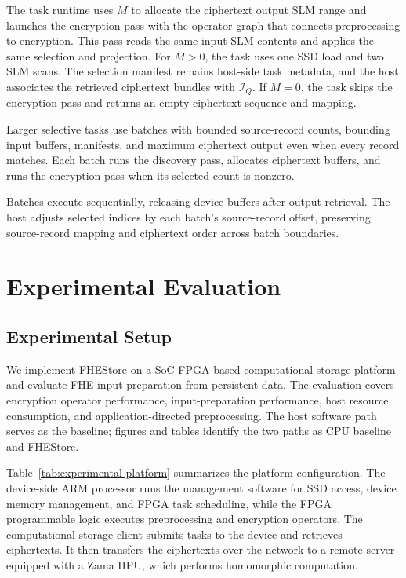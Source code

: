 \documentclass[sigconf,anonymous,balance=false]{acmart}
\newcommand{\bodypar}{\par\vskip 0pt plus 6pt\relax}
\begin{document}
The task runtime uses $M$ to allocate the ciphertext output SLM range and launches the encryption pass with the operator graph that connects preprocessing to encryption. This pass reads the same input SLM contents and applies the same selection and projection. For $M>0$, the task uses one SSD load and two SLM scans. The selection manifest remains host-side task metadata, and the host associates the retrieved ciphertext bundles with $\mathcal{I}_Q$. If $M=0$, the task skips the encryption pass and returns an empty ciphertext sequence and mapping.
\bodypar

Larger selective tasks use batches with bounded source-record counts, bounding input buffers, manifests, and maximum ciphertext output even when every record matches. Each batch runs the discovery pass, allocates ciphertext buffers, and runs the encryption pass when its selected count is nonzero.
\bodypar

Batches execute sequentially, releasing device buffers after output retrieval. The host adjusts selected indices by each batch's source-record offset, preserving source-record mapping and ciphertext order across batch boundaries.

\section{Experimental Evaluation}
\label{sec:evaluation}
\subsection{Experimental Setup}
We implement FHEStore on a SoC FPGA-based computational storage platform and evaluate FHE input preparation from persistent data. The evaluation covers encryption operator performance, input-preparation performance, host resource consumption, and application-directed preprocessing. The host software path serves as the baseline; figures and tables identify the two paths as CPU baseline and FHEStore.
\bodypar

Table~\ref{tab:experimental-platform} summarizes the platform configuration. The device-side ARM processor runs the management software for SSD access, device memory management, and FPGA task scheduling, while the FPGA programmable logic executes preprocessing and encryption operators. The computational storage client submits tasks to the device and retrieves ciphertexts. It then transfers the ciphertexts over the network to a remote server equipped with a Zama HPU, which performs homomorphic computation.
\bodypar
\end{document}
